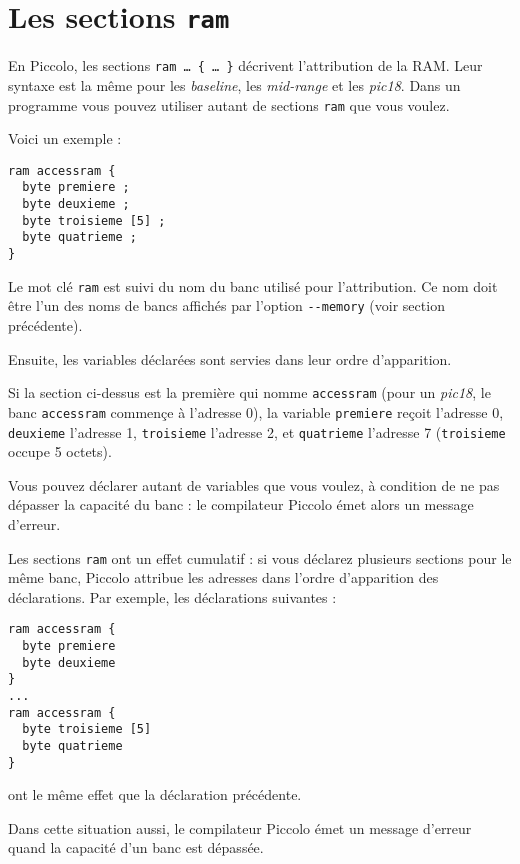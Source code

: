 \section{Les sections \texttt{ram}}

En Piccolo, les sections \texttt{ram … \{ … \}} décrivent l’attribution de la RAM. Leur syntaxe est la même pour les \emph{baseline}, les \emph{mid-range} et les \emph{pic18}. Dans un programme vous pouvez utiliser autant de sections \texttt{ram} que vous voulez.

Voici un exemple :

\begin{lstlisting}[language=piccolo]
ram accessram {
  byte premiere ;
  byte deuxieme ;
  byte troisieme [5] ;
  byte quatrieme ;
}
\end{lstlisting}

Le mot clé \texttt{ram} est suivi du nom du banc utilisé pour l’attribution. Ce nom doit être l’un des noms de bancs affichés par l’option \texttt{-{}-memory} (voir section précédente).

Ensuite, les variables déclarées sont servies dans leur ordre d'apparition.

Si la section ci-dessus est la première qui nomme \texttt{accessram} (pour un \emph{pic18}, le banc \texttt{accessram} commençe à l’adresse 0), la variable \texttt{premiere} reçoit l’adresse 0, \texttt{deuxieme} l’adresse 1, \texttt{troisieme} l’adresse 2, et \texttt{quatrieme} l’adresse 7 (\texttt{troisieme} occupe 5 octets).

Vous pouvez déclarer autant de variables que vous voulez, à condition de ne pas dépasser la capacité du banc : le compilateur Piccolo émet alors un message d’erreur.

Les sections \texttt{ram} ont un effet cumulatif : si vous déclarez plusieurs sections pour le même banc, Piccolo attribue les adresses dans l’ordre d’apparition des déclarations. Par exemple, les déclarations suivantes :

\begin{lstlisting}[language=piccolo]
ram accessram {
  byte premiere
  byte deuxieme
}
...
ram accessram {
  byte troisieme [5]
  byte quatrieme
}
\end{lstlisting}

ont le même effet que la déclaration précédente.

Dans cette situation aussi, le compilateur Piccolo émet un message d’erreur quand la capacité d’un banc est dépassée. 



